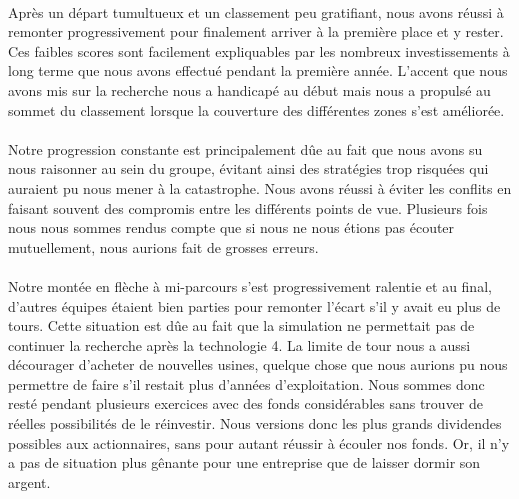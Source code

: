 \paragraph{}
Après un départ tumultueux et un classement peu gratifiant, nous avons réussi
à remonter progressivement pour finalement arriver à la première place et y
rester. Ces faibles scores sont facilement expliquables par les nombreux
investissements à long terme que nous avons effectué pendant la première
année. L'accent que nous avons mis sur la recherche nous a handicapé au début
mais nous a propulsé au sommet du classement lorsque la couverture des
différentes zones s'est améliorée.

\paragraph{}
Notre progression constante est principalement dûe au fait que nous avons su
nous raisonner au sein du groupe, évitant ainsi des stratégies trop risquées
qui auraient pu nous mener à la catastrophe. Nous avons réussi à éviter les
conflits en faisant souvent des compromis entre les différents points de vue.
Plusieurs fois nous nous sommes rendus compte que si nous ne nous étions pas
écouter mutuellement, nous aurions fait de grosses erreurs.

\paragraph{}
Notre montée en flèche à mi-parcours s'est progressivement ralentie et au
final, d'autres équipes étaient bien parties pour remonter l'écart s'il y
avait eu plus de tours. Cette situation est dûe au fait que la simulation ne
permettait pas de continuer la recherche après la technologie 4. La limite de
tour nous a aussi décourager d'acheter de nouvelles usines, quelque chose que
nous aurions pu nous permettre de faire s'il restait plus d'années
d'exploitation. Nous sommes donc resté pendant plusieurs exercices avec des
fonds considérables sans trouver de réelles possibilités de le réinvestir.
Nous versions donc les plus grands dividendes possibles aux actionnaires, sans
pour autant réussir à écouler nos fonds. Or, il n'y a pas de situation plus
gênante pour une entreprise que de laisser dormir son argent.
